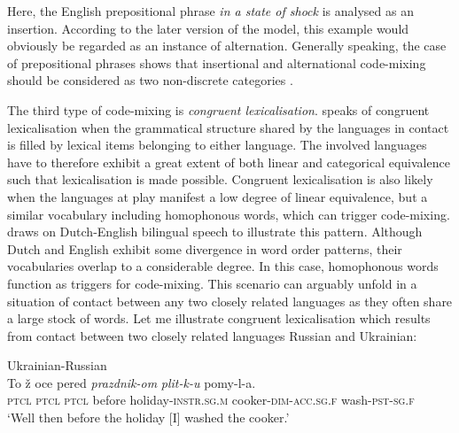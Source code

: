\noindent Here, the English prepositional phrase \textit{in a state of shock} is analysed as an insertion. According to the later version of the model, this example would obviously be regarded as an instance of alternation. Generally speaking, the case of prepositional phrases shows that insertional and alternational code-mixing should be considered as two non-discrete categories \citep[cf.][95]{backus-two-1996}.

The third type of code-mixing is \textit{congruent lexicalisation}. \citet[3--4]{muysken-bilingual-2000} speaks of congruent lexicalisation when the grammatical structure shared by the languages in contact is filled by lexical items belonging to either language. The involved languages have to therefore exhibit a great extent of both linear and categorical equivalence such that lexicalisation is made possible. Congruent lexicalisation is also likely when the languages at play manifest a low degree of linear equivalence, but a similar vocabulary including homophonous words, which can trigger code-mixing. \citet[][123]{muysken-bilingual-2000} draws on Dutch-English bilingual speech to illustrate this pattern. Although Dutch and English exhibit some divergence in word order patterns, their vocabularies overlap to a considerable degree. In this case, homophonous words function as triggers for code-mixing. This scenario can arguably unfold in a situation of contact between any two closely related languages as they often share a large stock of words. Let me illustrate congruent lexicalisation which results from contact between two closely related languages Russian and Ukrainian:

\ea{\label{ex:1:6}}
Ukrainian-Russian \citep{vahtin-novye-2003}\\
\gll To ž oce pered \textit{prazdnik-om} \textit{plit-k-u} pomy-l-a.\\
	\textsc{ptcl} \textsc{ptcl} \textsc{ptcl} before holiday-\textsc{instr.sg.m} cooker-\textsc{dim}-\textsc{acc.sg.f} wash-\textsc{pst-sg.f}\\
\glt `Well then before the holiday [I] washed the cooker.' 
\z

